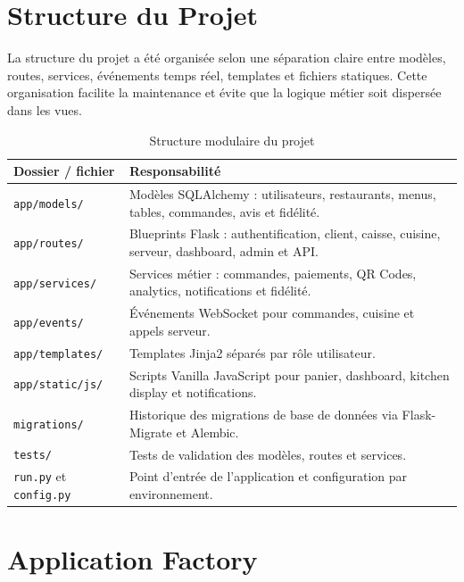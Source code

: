 \documentclass[12pt,a4paper]{report}
\begin{document}
\section{Structure du Projet}

La structure du projet a été organisée selon une séparation claire entre modèles, routes, services, événements temps réel, templates et fichiers statiques. Cette organisation facilite la maintenance et évite que la logique métier soit dispersée dans les vues.

\begin{table}[H]
    \centering
    \begin{tabularx}{\textwidth}{l X}
        \toprule
        \rowcolor{secondary!10}
        \textbf{Dossier / fichier} & \textbf{Responsabilité} \\
        \midrule
        \texttt{app/models/} & Modèles SQLAlchemy : utilisateurs, restaurants, menus, tables, commandes, avis et fidélité. \\
        \texttt{app/routes/} & Blueprints Flask : authentification, client, caisse, cuisine, serveur, dashboard, admin et API. \\
        \texttt{app/services/} & Services métier : commandes, paiements, QR Codes, analytics, notifications et fidélité. \\
        \texttt{app/events/} & Événements WebSocket pour commandes, cuisine et appels serveur. \\
        \texttt{app/templates/} & Templates Jinja2 séparés par rôle utilisateur. \\
        \texttt{app/static/js/} & Scripts Vanilla JavaScript pour panier, dashboard, kitchen display et notifications. \\
        \texttt{migrations/} & Historique des migrations de base de données via Flask-Migrate et Alembic. \\
        \texttt{tests/} & Tests de validation des modèles, routes et services. \\
        \texttt{run.py} et \texttt{config.py} & Point d'entrée de l'application et configuration par environnement. \\
        \bottomrule
    \end{tabularx}
    \caption{Structure modulaire du projet}
    \label{tab:project-structure}
\end{table}

\section{Application Factory}
\end{document}

